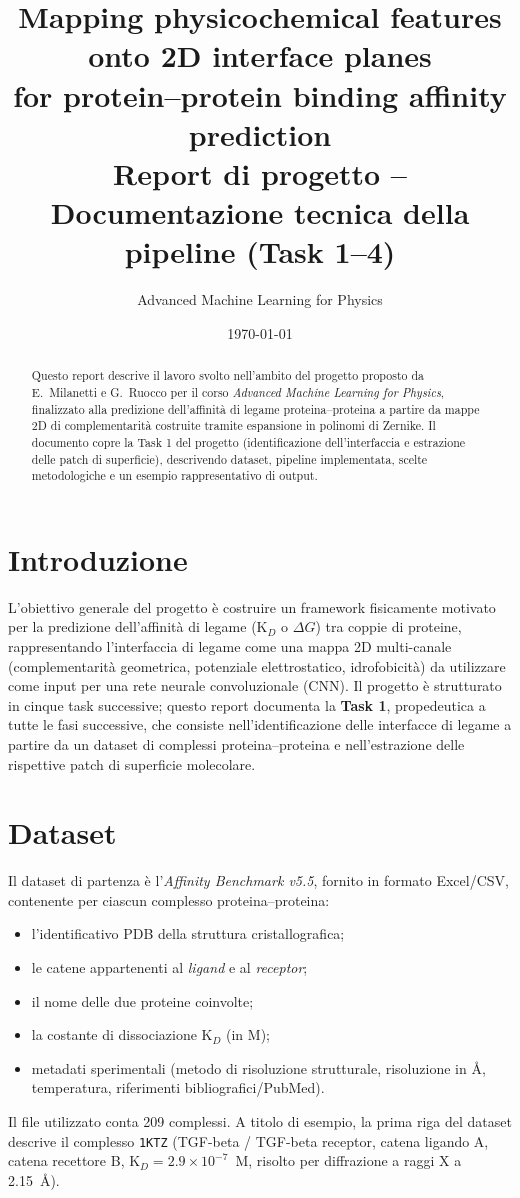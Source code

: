 \documentclass[11pt,a4paper]{article}
\title{Mapping physicochemical features onto 2D interface planes\\
for protein--protein binding affinity prediction\\[4pt]
\large Report di progetto -- Documentazione tecnica della pipeline (Task 1--4)}
\author{Advanced Machine Learning for Physics}
\date{\today}
\begin{document}
\maketitle

\begin{abstract}
Questo report descrive il lavoro svolto nell'ambito del progetto proposto da E.\ Milanetti e G.\ Ruocco per il corso \emph{Advanced Machine Learning for Physics}, finalizzato alla predizione dell'affinità di legame proteina--proteina a partire da mappe 2D di complementarità costruite tramite espansione in polinomi di Zernike. Il documento copre la Task 1 del progetto (identificazione dell'interfaccia e estrazione delle patch di superficie), descrivendo dataset, pipeline implementata, scelte metodologiche e un esempio rappresentativo di output.
\end{abstract}

\tableofcontents

\section{Introduzione}
L'obiettivo generale del progetto è costruire un framework fisicamente motivato per la predizione dell'affinità di legame (K$_D$ o $\Delta G$) tra coppie di proteine, rappresentando l'interfaccia di legame come una mappa 2D multi-canale (complementarità geometrica, potenziale elettrostatico, idrofobicità) da utilizzare come input per una rete neurale convoluzionale (CNN). Il progetto è strutturato in cinque task successive; questo report documenta la \textbf{Task 1}, propedeutica a tutte le fasi successive, che consiste nell'identificazione delle interfacce di legame a partire da un dataset di complessi proteina--proteina e nell'estrazione delle rispettive patch di superficie molecolare.

\section{Dataset}
Il dataset di partenza è l'\emph{Affinity Benchmark v5.5}, fornito in formato Excel/CSV, contenente per ciascun complesso proteina--proteina:
\begin{itemize}
    \item l'identificativo PDB della struttura cristallografica;
    \item le catene appartenenti al \emph{ligand} e al \emph{receptor};
    \item il nome delle due proteine coinvolte;
    \item la costante di dissociazione K$_D$ (in M);
    \item metadati sperimentali (metodo di risoluzione strutturale, risoluzione in \r{A}, temperatura, riferimenti bibliografici/PubMed).
\end{itemize}
Il file utilizzato conta 209 complessi. A titolo di esempio, la prima riga del dataset descrive il complesso \texttt{1KTZ} (TGF-beta / TGF-beta receptor, catena ligando A, catena recettore B, K$_D = 2.9\times10^{-7}$~M, risolto per diffrazione a raggi X a 2.15~\r{A}).
\end{document}
